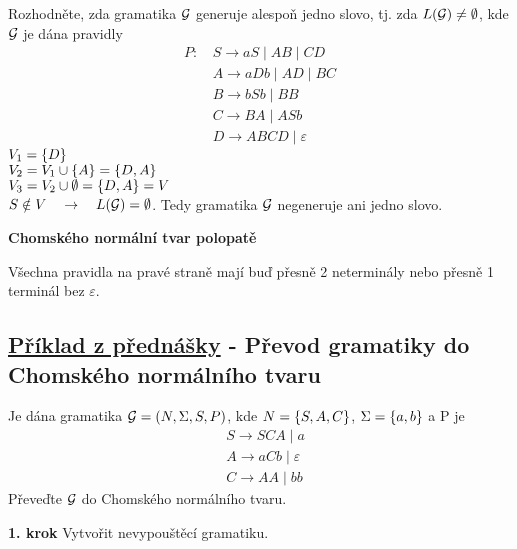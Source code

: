 Rozhodněte, zda gramatika $\mathcal{G}$ generuje alespoň jedno slovo, tj. zda $L(\mathcal{G}) \neq \emptyset$, kde $\mathcal{G}$ je dána pravidly 
\begin{align*}
    P\text{: } & S \rightarrow aS \mid AB \mid CD \\
    & A \rightarrow aDb \mid AD \mid BC \\
    & B \rightarrow bSb \mid BB \\
    & C \rightarrow BA \mid ASb \\
    & D \rightarrow ABCD \mid \varepsilon
\end{align*}
$V_1 = \left\lbrace D \right\rbrace$\\ 
$V_2 = V_1 \cup \left\lbrace A \right\rbrace = \left\lbrace D, A \right\rbrace$\\ 
$V_3 = V_2 \cup \emptyset = \left\lbrace D, A \right\rbrace = V$\\
$S \notin V \quad \rightarrow \quad L(\mathcal{G}) = \emptyset$. Tedy gramatika $\mathcal{G}$ negeneruje ani jedno slovo.

\textbf{Chomského normální tvar polopatě}

Všechna pravidla na pravé straně mají buď přesně 2 neterminály nebo přesně 1 terminál bez $\varepsilon$.

\subsection{\href{https://youtu.be/jwrE-ez7S8I?list=PLQL6z4JeTTQkLuzI78OTnfYBclE1g0UjS&t=1846}{Příklad z přednášky} - Převod gramatiky do Chomského normálního tvaru}
Je dána gramatika $\mathcal{G} = (N, \Sigma, S, P)$, kde $N = \left\lbrace S, A, C \right\rbrace$, $\Sigma = \left\lbrace a, b \right\rbrace$ a P je 
\begin{align*}
    & S \rightarrow SCA \mid a \\
    & A \rightarrow aCb \mid \varepsilon \\
    & C \rightarrow AA \mid bb
\end{align*}
Převeďte $\mathcal{G}$ do Chomského normálního tvaru. 

\textbf{1. krok} Vytvořit nevypouštěcí gramatiku. 

